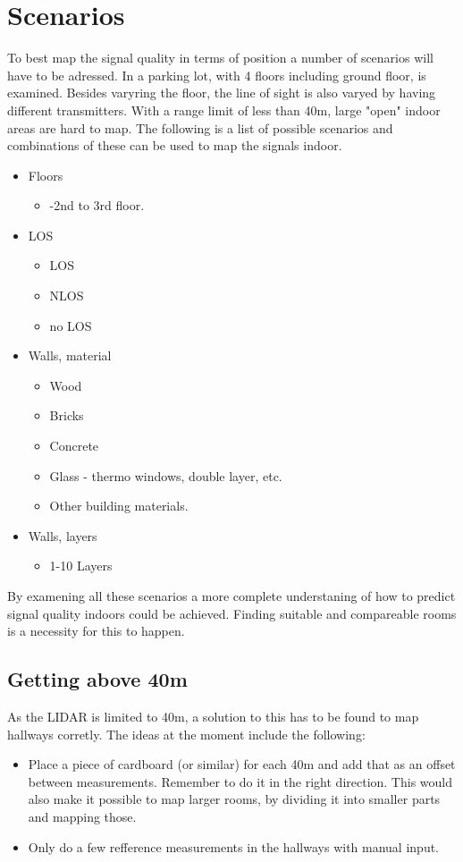 \documentclass[a4paper,twoside, 12pt]{article}
\begin{document}
\section{Scenarios}\label{sec:scenarios}
To best map the signal quality in terms of position a number of scenarios will have to be adressed. In \cite{artikel} a parking lot, with 4 floors including ground floor, is examined. Besides varyring the floor, the line of sight is also varyed by having different transmitters. With a range limit of less than 40m, large "open" indoor areas are hard to map. The following is a list of possible scenarios and combinations of these can be used to map the signals indoor. 
\begin{itemize}
	\item Floors
	\begin{itemize}
		\item -2nd to 3rd floor.
	\end{itemize}
	\item LOS
	\begin{itemize}
		\item LOS
		\item NLOS
		\item no LOS
	\end{itemize}
	\item Walls, material
	\begin{itemize}
		\item Wood
		\item Bricks
		\item Concrete
		\item Glass - thermo windows, double layer, etc.
		\item Other building materials.
	\end{itemize}
	\item Walls, layers
	\begin{itemize}
		\item 1-10 Layers
	\end{itemize}
\end{itemize}

By examening all these scenarios a more complete understaning of how to predict signal quality indoors could be achieved. Finding suitable and compareable rooms is a necessity for this to happen. 


\subsection{Getting above 40m}
As the LIDAR is limited to 40m, a solution to this has to be found to map hallways corretly. The ideas at the moment include the following:
\begin{itemize}
	\item Place a piece of cardboard (or similar) for each 40m and add that as an offset between measurements. Remember to do it in the right direction. This would also make it possible to map larger rooms, by dividing it into smaller parts and mapping those.
	\item Only do a few refference measurements in the hallways with manual input.
\end{itemize}
\end{document}
